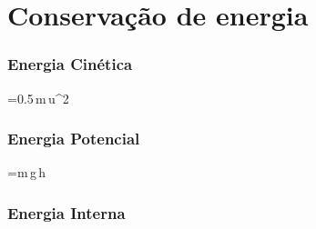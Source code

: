 \documentclass{article}
\begin{document}
\section{Conservação de energia}
\label{ - Conservação de energia}
\begin{multicols}{3}

\noindent%
\begin{minipage}{\linewidth}
	
	\subsubsection{Energia Cinética}
	
	\begin{tcolorbox}
	\begin{BM}
		=0.5\,m\,\Delta u^2
	\end{BM}
	\end{tcolorbox}
	
\end{minipage}

\vspace{5mm}

\noindent%
\begin{minipage}{\linewidth}
	
	\subsubsection{Energia Potencial}
	
	\begin{tcolorbox}
	\begin{BM}
		=m\,g\,\Delta h
	\end{BM}
	\end{tcolorbox}
	
\end{minipage}

\vspace{5mm}

\noindent%
\begin{minipage}{\linewidth}
	
	\subsubsection{Energia Interna}
	
	\begin{tcolorbox}
	\begin{BM}
		\mathrm{U}
	\end{BM}
	\end{tcolorbox}
	

\end{minipage}
\end{multicols}
\end{document}
